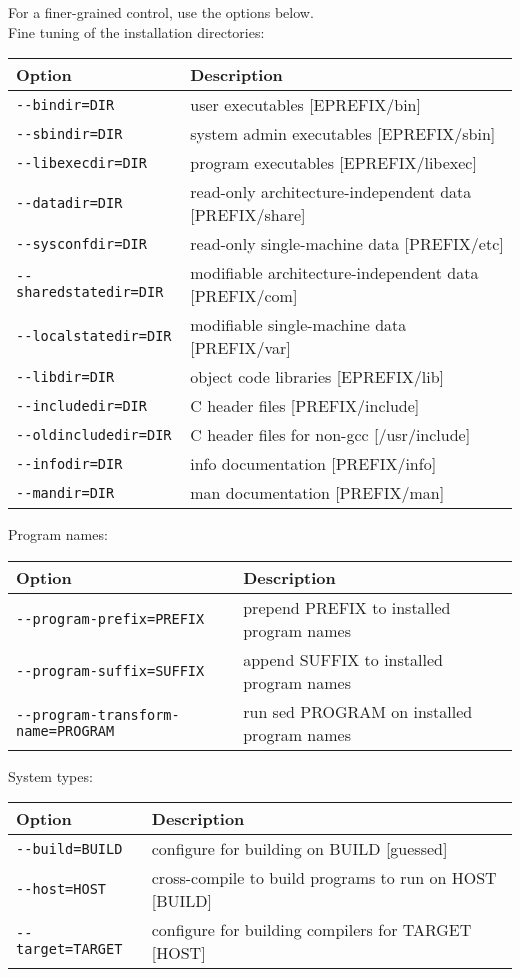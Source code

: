 For a finer-grained control, use the options below. \\


Fine tuning of the installation directories:

\begin{center}
\begin{tabular}{|l|l|}
\hline 
\textbf{Option}  & \textbf{Description} \tabularnewline
\hline 
\texttt{-{-}bindir=DIR}  & user executables {[}EPREFIX/bin{]} \tabularnewline
\texttt{-{-}sbindir=DIR}  & system admin executables {[}EPREFIX/sbin{]} \tabularnewline
\texttt{-{-}libexecdir=DIR}  & program executables {[}EPREFIX/libexec{]} \tabularnewline
\texttt{-{-}datadir=DIR}  & read-only architecture-independent data {[}PREFIX/share{]} \tabularnewline
\texttt{-{-}sysconfdir=DIR}  & read-only single-machine data {[}PREFIX/etc{]} \tabularnewline
\texttt{-{-}sharedstatedir=DIR}  & modifiable architecture-independent data {[}PREFIX/com{]} \tabularnewline
\texttt{-{-}localstatedir=DIR}  & modifiable single-machine data {[}PREFIX/var{]} \tabularnewline
\texttt{-{-}libdir=DIR}  & object code libraries {[}EPREFIX/lib{]} \tabularnewline
\texttt{-{-}includedir=DIR}  & C header files {[}PREFIX/include{]} \tabularnewline
\texttt{-{-}oldincludedir=DIR}  & C header files for non-gcc {[}/usr/include{]} \tabularnewline
\texttt{-{-}infodir=DIR}  & info documentation {[}PREFIX/info{]} \tabularnewline
\texttt{-{-}mandir=DIR}  & man documentation {[}PREFIX/man{]} \tabularnewline
\hline
\end{tabular}
\par\end{center}

Program names:

\begin{center}
\begin{tabular}{|l|p{7cm}|}
\hline 
\textbf{Option}  & \textbf{Description} \tabularnewline
\hline 
\texttt{-{-}program-prefix=PREFIX}  & prepend PREFIX to installed program names \tabularnewline
\texttt{-{-}program-suffix=SUFFIX}  & append SUFFIX to installed program names \tabularnewline
\texttt{-{-}program-transform-name=PROGRAM}  & run sed PROGRAM on installed program names \tabularnewline
\hline
\end{tabular}
\par\end{center}

System types:

\begin{center}
\begin{tabular}{|l|l|}
\hline 
\textbf{Option}  & \textbf{Description} \tabularnewline
\hline 
\texttt{-{-}build=BUILD}  & configure for building on BUILD {[}guessed{]} \tabularnewline
\texttt{-{-}host=HOST}  & cross-compile to build programs to run on HOST {[}BUILD{]} \tabularnewline
\texttt{-{-}target=TARGET}  & configure for building compilers for TARGET {[}HOST{]} \tabularnewline
\hline
\end{tabular}
\par\end{center}

